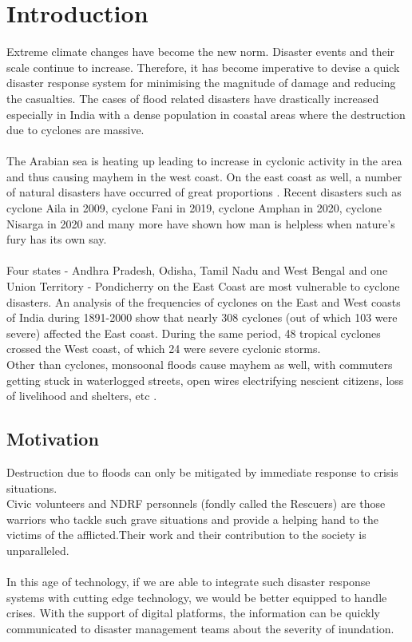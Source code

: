 \documentclass[12pt]{article}
\begin{document}
\section{Introduction}
Extreme climate changes have become the new norm. Disaster events and their scale continue to increase. Therefore, it has become imperative to devise a quick disaster response system for minimising the magnitude of damage and reducing the casualties. The cases of flood related disasters have drastically increased especially in India with a dense population in coastal areas where the destruction due to cyclones are massive.\\\\
The Arabian sea is heating up leading to increase in cyclonic activity in the area and thus causing mayhem in the west coast. On the east coast as well, a number of natural disasters have occurred of great proportions . Recent disasters such as cyclone Aila in 2009, cyclone Fani in 2019, cyclone Amphan in 2020, cyclone Nisarga in 2020 and many more have shown how man is helpless when nature’s fury has its own say.\\\\
Four states - Andhra Pradesh, Odisha, Tamil Nadu and West Bengal and one Union Territory - Pondicherry on the East Coast are most vulnerable to cyclone disasters. An analysis of the frequencies of cyclones on the East and West coasts of India during 1891-2000 show that nearly 308 cyclones (out of which 103 were severe) affected the East coast. During the same period, 48 tropical cyclones crossed the West coast, of which 24 were severe cyclonic storms.\\[0.5cm]
Other than cyclones, monsoonal floods cause mayhem as well, with commuters getting stuck in waterlogged streets, open wires electrifying nescient citizens, loss of livelihood and shelters, etc . 
\subsection{Motivation}
Destruction due to floods can only be mitigated by immediate response to crisis situations.\\
Civic volunteers and NDRF personnels (fondly called the Rescuers) are those warriors who tackle such grave situations and provide a helping hand to the victims of the afflicted.Their work and their contribution to the society is unparalleled.\\\\
In this age of technology, if we are able to integrate such disaster response systems with cutting edge technology, we would be better equipped to handle crises. With the support of digital platforms, the information can be quickly communicated to disaster management teams about the severity of inundation.
\end{document}
